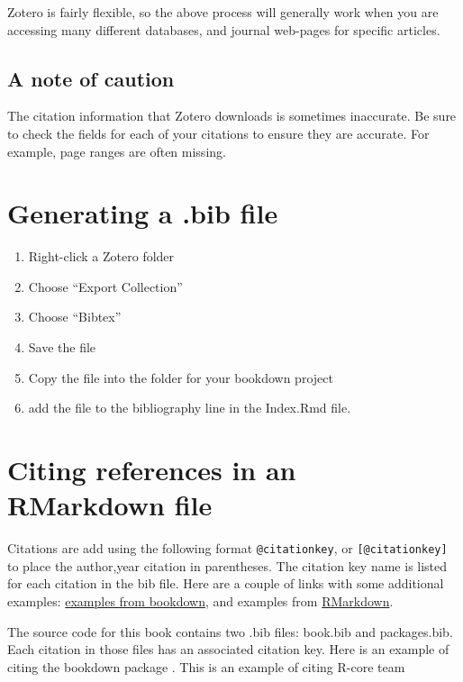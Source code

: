 \documentclass[
]{book}
\providecommand{\tightlist}{%
  \setlength{\itemsep}{0pt}\setlength{\parskip}{0pt}}
\begin{document}
Zotero is fairly flexible, so the above process will generally work when you are accessing many different databases, and journal web-pages for specific articles.

\hypertarget{a-note-of-caution}{%
\subsection{A note of caution}\label{a-note-of-caution}}

The citation information that Zotero downloads is sometimes inaccurate. Be sure to check the fields for each of your citations to ensure they are accurate. For example, page ranges are often missing.

\hypertarget{generating-a-.bib-file}{%
\section{Generating a .bib file}\label{generating-a-.bib-file}}

\begin{enumerate}
\def\labelenumi{\arabic{enumi}.}
\tightlist
\item
  Right-click a Zotero folder
\item
  Choose ``Export Collection''
\item
  Choose ``Bibtex''
\item
  Save the file
\item
  Copy the file into the folder for your bookdown project
\item
  add the file to the bibliography line in the Index.Rmd file.
\end{enumerate}

\hypertarget{citing-references-in-an-rmarkdown-file}{%
\section{Citing references in an RMarkdown file}\label{citing-references-in-an-rmarkdown-file}}

Citations are add using the following format \texttt{@citationkey}, or \texttt{{[}@citationkey{]}} to place the author,year citation in parentheses. The citation key name is listed for each citation in the bib file. Here are a couple of links with some additional examples: \href{https://bookdown.org/yihui/bookdown/citations.html}{examples from bookdown}, and examples from \href{http://rmarkdown.rstudio.com/authoring_bibliographies_and_citations.html}{RMarkdown}.

The source code for this book contains two .bib files: book.bib and packages.bib. Each citation in those files has an associated citation key. Here is an example of citing the bookdown package \citep{xie2015}. This is an example of citing R-core team \citep{R-base}
\end{document}
